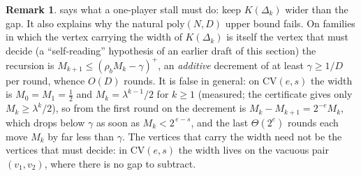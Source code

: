 \documentclass[11pt]{article}
\theoremstyle{plain}
\theoremstyle{definition}
\newtheorem{remark}[theorem]{Remark}
\begin{document}
\begin{remark}\label{rem:hybrid-narrow}
 says what a one-player stall must do: keep $K(\Delta_k)$
wider than the gap. It also explains why the natural $\mathrm{poly}(N,D)$
upper bound fails. On families in which the vertex carrying the width of
$K(\Delta_k)$ is itself the vertex that must decide (a ``self-reading''
hypothesis of an earlier draft of this section) the recursion is
$M_{k+1}\le(\rho_bM_k-\gamma)^{+}$, an \emph{additive} decrement of at
least $\gamma\ge1/D$ per round, whence $O(D)$ rounds. It is false in
general: on $\mathrm{CV}(e,s)$ the width is $M_0=M_1=\tfrac12$ and
$M_k=\lambda^{k-1}/2$ for $k\ge1$ (measured; the certificate gives only
$M_k\ge\lambda^{k}/2$), so from the first round on the decrement is
$M_k-M_{k+1}=2^{-e}M_k$, which
drops below $\gamma$ as soon as $M_k<2^{\,e-s}$, and the last $\Theta(2^{e})$
rounds each move $M_k$ by far less than $\gamma$. The vertices that carry the
width need not be the vertices that must decide: in $\mathrm{CV}(e,s)$ the
width lives on the vacuous pair $(v_1,v_2)$, where there is no gap to subtract.
\end{remark}
\end{document}
